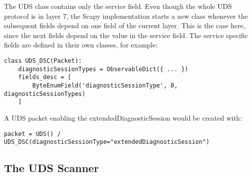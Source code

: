 
The UDS class contains only the service field. Even though the whole UDS protocol is in layer 7, the Scapy implementation starts a new class whenever the subsequent fields depend on one field of the current layer. This is the case here, since the next fields depend on the value in the service field. The service specific fields are defined in their own classes, for example:

\begin{samepage}
\begin{verbatim}
class UDS_DSC(Packet):
    diagnosticSessionTypes = ObservableDict({ ... })
    fields_desc = [
        ByteEnumField('diagnosticSessionType', 0,  diagnosticSessionTypes)
    ]
\end{verbatim}
\end{samepage}

A UDS packet enabling the extendedDiagnosticSession would be created with:

\begin{samepage}
\begin{verbatim}
packet = UDS() / UDS_DSC(diagnosticSessionType="extendedDiagnosticSession")
\end{verbatim}
\end{samepage}


\subsection{The UDS Scanner}

